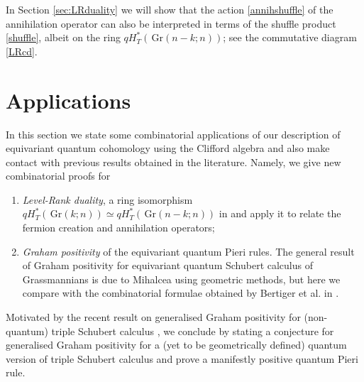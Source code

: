 \documentclass[12pt]{amsart}
\newcommand{\Gr}{\,\mathrm{Gr}}
\numberwithin{equation}{section}
\numberwithin{figure}{section}
\begin{document}
In Section \ref{sec:LRduality} we will show that the action \eqref{annihshuffle} of the annihilation operator can also be interpreted in terms of the shuffle product \eqref{shuffle}, albeit on the ring $qH^*_T(\Gr(n-k;n))$; see the commutative diagram \eqref{LRcd}.

\section{Applications}
In this section we state some combinatorial applications of our description of equivariant quantum cohomology using the Clifford algebra and also make contact with previous results obtained in the literature. Namely, we give new combinatorial proofs for
\begin{enumerate}
\item {\em Level-Rank duality}, a ring isomorphism $qH^*_T(\Gr(k;n))\simeq qH^*_T(\Gr(n-k;n))$ in \cite{gorbounovkorff2014,gorbounov2017quantum} and apply it to relate the fermion creation and annihilation operators;
\item {\em Graham positivity} of the equivariant quantum Pieri rules. The general result of Graham positivity for equivariant quantum Schubert calculus of Grassmannians is due to Mihalcea \cite{Mihalcea06} using geometric methods, but here we compare with the combinatorial formulae obtained by Bertiger et al. in \cite{BEMT22}.
\end{enumerate}
Motivated by the recent result \cite{gao2025graham} on generalised Graham positivity for (non-quantum) triple Schubert calculus  \cite{MS99,KnutTao2003}, we conclude by stating a conjecture for generalised Graham positivity for a (yet to be geometrically defined) quantum version of triple Schubert calculus and prove a manifestly positive quantum Pieri rule.
\end{document}
